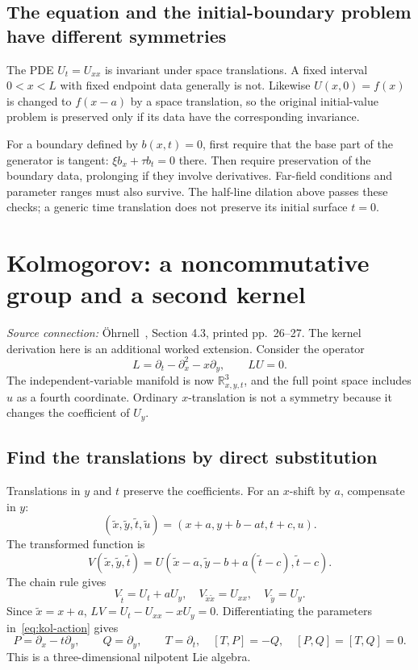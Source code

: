 \documentclass[11pt,a4paper]{article}
\numberwithin{equation}{section}
\theoremstyle{definition}
\theoremstyle{plain}
\theoremstyle{remark}
\newcommand{\R}{\mathbb R}
\newcommand{\source}[1]{\textit{Source connection:} \"Ohrnell~\cite{ohrnell}, #1.}
\begin{document}
\subsection{The equation and the initial-boundary problem have different symmetries}
The PDE $U_t=U_{xx}$ is invariant under space translations. A fixed interval $0<x<L$ with fixed endpoint data generally is not. Likewise $U(x,0)=f(x)$ is changed to $f(x-a)$ by a space translation, so the original initial-value problem is preserved only if its data have the corresponding invariance.

For a boundary defined by $b(x,t)=0$, first require that the base part of the generator is tangent: $\xi b_x+\tau b_t=0$ there. Then require preservation of the boundary data, prolonging if they involve derivatives. Far-field conditions and parameter ranges must also survive. The half-line dilation above passes these checks; a generic time translation does not preserve its initial surface $t=0$.

\section{Kolmogorov: a noncommutative group and a second kernel}\label{sec:kolmogorov}
\source{Section 4.3, printed pp.~26--27. The kernel derivation here is an additional worked extension}
Consider the operator
\[
L=\partial_t-\partial_x^2-x\partial_y,\qquad LU=0.
\]
The independent-variable manifold is now $\R^3_{x,y,t}$, and the full point space includes $u$ as a fourth coordinate. Ordinary $x$-translation is not a symmetry because it changes the coefficient of $U_y$.

\subsection{Find the translations by direct substitution}
Translations in $y$ and $t$ preserve the coefficients. For an $x$-shift by $a$, compensate in $y$:
\begin{equation}\label{eq:kol-action}
(\widetilde x,\widetilde y,\widetilde t,\widetilde u)
=(x+a,y+b-at,t+c,u).
\end{equation}
The transformed function is
\[
V(\widetilde x,\widetilde y,\widetilde t)
=U(\widetilde x-a,\widetilde y-b+a(\widetilde t-c),\widetilde t-c).
\]
The chain rule gives
\[
V_{\widetilde t}=U_t+aU_y,\quad V_{\widetilde x\widetilde x}=U_{xx},\quad V_{\widetilde y}=U_y.
\]
Since $\widetilde x=x+a$, $LV=U_t-U_{xx}-xU_y=0$. Differentiating the parameters in~\eqref{eq:kol-action} gives
\[
P=\partial_x-t\partial_y,\qquad Q=\partial_y,\qquad T=\partial_t,
\quad [T,P]=-Q,\quad[P,Q]=[T,Q]=0.
\]
This is a three-dimensional nilpotent Lie algebra.
\end{document}
